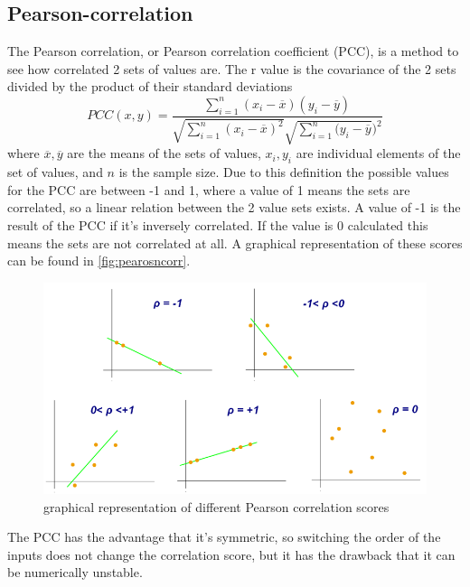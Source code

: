 \subsection{Pearson-correlation}
The Pearson correlation, or Pearson correlation coefficient (PCC), is a method to see how correlated 2 sets of values are. The r value is the covariance of the 2 sets divided by the product of their standard deviations $$PCC(x,y) =\frac{\sum_{i=1}^n (x_i-\overline{x})(y_i-\overline{y})}{\sqrt{\sum_{i=1}^n (x_i-\overline{x})^2}\sqrt{\sum_{i=1}^n(y_i-\overline{y}})^2}$$ where $\overline{x},  \overline{y}$ are the means of the sets of values, $x_i, y_i$ are individual elements of the set of values, and $n$ is the sample size. 
Due to this definition the possible values for the PCC are between -1 and 1, where a value of 1 means the sets are correlated, so a linear relation between the 2 value sets exists. A value of -1 is the result of the PCC if it's inversely correlated. 
If the value is 0 calculated this means the sets are not correlated at all. A graphical representation of these scores can be found in \autoref{fig:pearosncorr}. \cite{pearsoncorr}
\begin{figure}[ht]
    \centering
    \includegraphics[width=0.7\linewidth]{Latex//sections//images/pearson correlation.png}
    \caption{graphical representation of different Pearson correlation scores \cite{pearsoncorrimage}}
    
    \label{fig:pearosncorr}
\end{figure}

The PCC has the advantage that it's symmetric, so switching the order of the inputs does not change the correlation score, but it has the drawback that it can be numerically unstable.%
